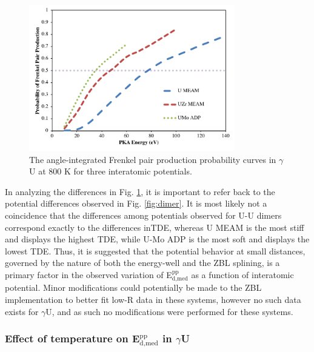 \documentclass[review]{elsarticle}
\begin{document}
\begin{figure}[h]
 \centering
 \includegraphics[width=0.8\textwidth]{gam800.png} 
 \caption{The angle-integrated Frenkel pair production probability curves in $\gamma$U at 800 K for three interatomic potentials.}
 \label{fig:gam800}
\end{figure}

In analyzing the differences in Fig. \ref{fig:gam800}, it is important to refer back to the potential differences observed in Fig. \ref{fig:dimer}. It is most likely not a coincidence that the differences among potentials observed for U-U dimers correspond exactly to the differences inTDE, whereas U MEAM is the most stiff and displays the highest TDE, while U-Mo ADP is the most soft and displays the lowest TDE. Thus, it is suggested that the potential behavior at small distances, governed by the nature of both the energy-well and the ZBL splining, is a primary factor in the observed variation of E$^{\textrm{pp}}_{\textrm{d,med}}$ as a function of interatomic potential. Minor modifications could potentially be made to the ZBL implementation to better fit low-R data in these systems, however no such data exists for $\gamma$U, and as such no modifications were performed for these systems.

\FloatBarrier

\subsubsection{Effect of temperature on E$^{\textrm{pp}}_{\textrm{d,med}}$ in $\gamma$U}
\end{document}
